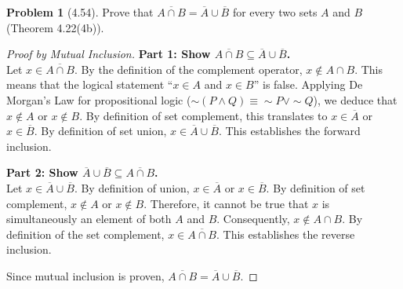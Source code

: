 \documentclass[11pt]{article}
\theoremstyle{definition}
\newtheorem{problem}{Problem}
\begin{document}
\begin{problem}[4.54]
Prove that $\overline{A \cap B} = \overline{A} \cup \overline{B}$ for every two sets $A$ and $B$ (Theorem 4.22(4b)).
\end{problem}
\begin{proof}[Proof by Mutual Inclusion]
\textbf{Part 1: Show $\overline{A \cap B} \subseteq \overline{A} \cup \overline{B}$.} \\
Let $x \in \overline{A \cap B}$. By the definition of the complement operator, $x \notin A \cap B$. 
This means that the logical statement ``$x \in A$ and $x \in B$'' is false. Applying De Morgan's Law for propositional logic ($\sim(P \land Q) \equiv \sim P \lor \sim Q$), we deduce that $x \notin A$ or $x \notin B$. 
By definition of set complement, this translates to $x \in \overline{A}$ or $x \in \overline{B}$. 
By definition of set union, $x \in \overline{A} \cup \overline{B}$. This establishes the forward inclusion.

\vspace{2mm}
\noindent\textbf{Part 2: Show $\overline{A} \cup \overline{B} \subseteq \overline{A \cap B}$.} \\
Let $x \in \overline{A} \cup \overline{B}$. By definition of union, $x \in \overline{A}$ or $x \in \overline{B}$.
By definition of set complement, $x \notin A$ or $x \notin B$. 
Therefore, it cannot be true that $x$ is simultaneously an element of both $A$ and $B$. 
Consequently, $x \notin A \cap B$. 
By definition of the set complement, $x \in \overline{A \cap B}$. This establishes the reverse inclusion.

Since mutual inclusion is proven, $\overline{A \cap B} = \overline{A} \cup \overline{B}$.
\end{proof}
\end{document}
